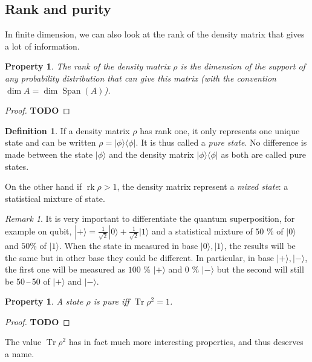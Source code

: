 \documentclass[10pt]{report}
\theoremstyle{plain}
\newtheorem{prop}[thm]{Property}
\theoremstyle{definition}
\newtheorem{defn}{Definition}[chapter]
\theoremstyle{remark}
\newtheorem*{rem}{Remark}
\newcommand{\TODO}{\textbf{TODO}}
\newcommand{\ket}[1]{|#1\rangle}
\newcommand{\bra}[1]{\langle#1|}
\DeclareMathOperator{\Tr}{Tr}
\DeclareMathOperator{\rk}{rk}
\DeclareMathOperator{\Span}{Span}
\begin{document}
\subsection{Rank and purity}

In finite dimension, we can also look at the
rank of the density matrix that gives a lot of information.

\begin{prop}
  The rank of the density matrix $\rho$ is the dimension of the support of any
  probability distribution that can give this matrix
  (with the convention $\dim A = \dim \Span(A)$).
\end{prop}

\begin{proof}
   \TODO
\end{proof}

\begin{defn}
  If a density matrix $\rho$ has rank one, it only represents one unique state and can be written
  $\rho = \ket \phi \bra \phi$. It is thus called a \emph{pure state}. No
  difference is made between the state $\ket \phi$ and the density matrix $\ket
  \phi \bra \phi$ as both are called pure states.

  On the other hand if $\rk \rho > 1$, the density matrix represent a
  \emph{mixed state}: a statistical mixture of state.
\end{defn}

\begin{rem}
  It is very important to differentiate the quantum superposition, for example
  on qubit,
  $\ket + = \frac1{\sqrt 2} \ket 0 + \frac1{\sqrt2} \ket 1$ and a statistical mixture of
  $50$ \% of $\ket 0$ and $50$\% of $\ket 1$. When the state in measured in base
  $\ket0,\ket1$, the results will be the same but in other base they could be
  different. In particular, in base $\ket +, \ket -$, the first one will be
  measured as $100$ \% $\ket +$ and $0$ \% $\ket -$ but the second will still be
  50\,--\,50 of $\ket+$ and $\ket -$.
\end{rem}

\begin{prop}
  A state $\rho$ is pure iff $\Tr \rho^2 = 1$.
\end{prop}

\begin{proof}
   \TODO
\end{proof}

The value $\Tr \rho^2$ has in fact much more interesting properties, and thus
deserves a name.
\end{document}
